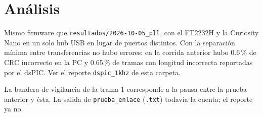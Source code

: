 \section{Análisis}

Mismo firmware que \texttt{resultados/2026-10-05\_pll}, con el FT2232H y la
Curiosity Nano en un solo hub USB en lugar de puertos distintos. Con la
separación mínima entre transferencias no hubo errores: en la corrida
anterior hubo 0.6\,\% de CRC incorrecto en la PC y 0.65\,\% de tramas con
longitud incorrecta reportadas por el dsPIC. Ver el reporte
\texttt{dspic\_1khz} de esta carpeta.

La bandera de vigilancia de la trama 1 corresponde a la pausa entre la
prueba anterior y ésta. La salida de \texttt{prueba\_enlace} (\texttt{.txt})
todavía la cuenta; el reporte ya no.
